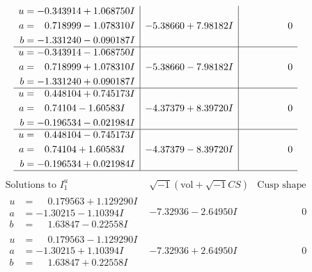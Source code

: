 \documentclass[1p]{elsarticle_modified}
\theoremstyle{definition}
\newcommand{\I}{\sqrt{-1}}
\begin{document}
$$\begin{array}{c|c|c}
\begin{aligned}
u &= -0.343914 + 1.068750 I \\
a &= \phantom{-}0.718999 - 1.078310 I \\
b &= -1.331240 - 0.090187 I\end{aligned}
 & -5.38660 + 7.98182 I & \phantom{-0.000000 } 0 \\ \hline\begin{aligned}
u &= -0.343914 - 1.068750 I \\
a &= \phantom{-}0.718999 + 1.078310 I \\
b &= -1.331240 + 0.090187 I\end{aligned}
 & -5.38660 - 7.98182 I & \phantom{-0.000000 } 0 \\ \hline\begin{aligned}
u &= \phantom{-}0.448104 + 0.745173 I \\
a &= \phantom{-}0.74104 - 1.60583 I \\
b &= -0.196534 - 0.021984 I\end{aligned}
 & -4.37379 + 8.39720 I & \phantom{-0.000000 } 0 \\ \hline\begin{aligned}
u &= \phantom{-}0.448104 - 0.745173 I \\
a &= \phantom{-}0.74104 + 1.60583 I \\
b &= -0.196534 + 0.021984 I\end{aligned}
 & -4.37379 - 8.39720 I & \phantom{-0.000000 } 0\\
 \hline 
 \end{array}$$\newpage$$\begin{array}{c|c|c}  
\text{Solutions to }I^u_{1}& \I (\text{vol} + \sqrt{-1}CS) & \text{Cusp shape}\\
 \hline 
\begin{aligned}
u &= \phantom{-}0.179563 + 1.129290 I \\
a &= -1.30215 - 1.10394 I \\
b &= \phantom{-}1.63847 - 0.22558 I\end{aligned}
 & -7.32936 - 2.64950 I & \phantom{-0.000000 } 0 \\ \hline\begin{aligned}
u &= \phantom{-}0.179563 - 1.129290 I \\
a &= -1.30215 + 1.10394 I \\
b &= \phantom{-}1.63847 + 0.22558 I\end{aligned}
 & -7.32936 + 2.64950 I & \phantom{-0.000000 } 0 \\ \hline\begin{aligned}

\end{aligned}
\end{array}$$
\end{document}
